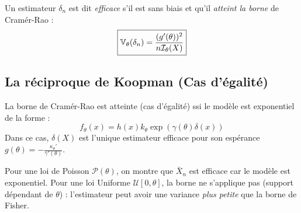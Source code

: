 \begin{definition}
    Un estimateur $\delta_n$ est dit \emph{efficace} s'il est sans biais et qu'il \emph{atteint la borne} de Cramér-Rao :
        $$ \boxed{\mathbb{V}_\theta( \delta_n) = \frac{(g'(\theta))^2}{n \mathcal{I}_\theta(X)}} $$
\end{definition}

\subsection{La réciproque de Koopman (Cas d'égalité)}

\begin{prop}
    La borne de Cramér-Rao est atteinte (cas d'égalité) ssi le modèle est exponentiel de la forme :
    $$ f_\theta(x) = h(x) k_\theta \exp( \gamma(\theta) \delta(x)) $$
    Dans ce cas, $\delta(X)$ est l'unique estimateur efficace pour son espérance $g(\theta) = - \frac{\kappa_\theta'}{\gamma'(\theta)}$.
\end{prop}

\begin{example}[Application TD]
    Pour une loi de Poisson $\mathcal{P}(\theta)$, on montre que $\bar{X}_n$ est efficace car le modèle est exponentiel. Pour une loi Uniforme $\mathcal{U}[0, \theta]$, la borne ne s'applique pas (support dépendant de $\theta$) : l'estimateur peut avoir une variance \textit{plus petite} que la borne de Fisher.
\end{example}
